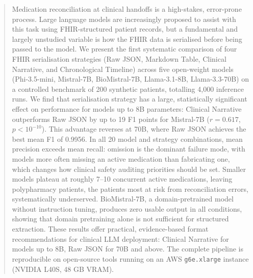 \begin{abstract}
Medication reconciliation at clinical handoffs is a high-stakes, error-prone process.
Large language models are increasingly proposed to assist with this task using
FHIR-structured patient records, but a fundamental and largely unstudied variable is
how the FHIR data is serialised before being passed to the model. We present the first
systematic comparison of four FHIR serialisation strategies (Raw JSON, Markdown Table,
Clinical Narrative, and Chronological Timeline) across five open-weight models
(Phi-3.5-mini, Mistral-7B, BioMistral-7B, Llama-3.1-8B, Llama-3.3-70B) on a
controlled benchmark of 200 synthetic patients, totalling 4,000 inference runs. We
find that serialisation strategy has a large, statistically significant effect on
performance for models up to 8B parameters: Clinical Narrative outperforms Raw JSON
by up to 19 F1 points for Mistral-7B ($r = 0.617$, $p < 10^{-10}$). This advantage
reverses at 70B, where Raw JSON achieves the best mean F1 of 0.9956. In all 20
model and strategy combinations, mean precision exceeds mean recall: omission is the
dominant failure mode, with models more often missing an active medication than
fabricating one, which changes how clinical safety auditing priorities should be set. Smaller models plateau at roughly 7--10 concurrent
active medications, leaving polypharmacy patients, the patients most at risk from
reconciliation errors, systematically underserved. BioMistral-7B, a domain-pretrained
model without instruction tuning, produces zero usable output in all conditions,
showing that domain pretraining alone is not sufficient for structured extraction.
These results offer practical, evidence-based format recommendations for clinical LLM
deployment: Clinical Narrative for models up to 8B, Raw JSON for 70B and above. The
complete pipeline is reproducible on open-source tools running on an AWS
\texttt{g6e.xlarge} instance (NVIDIA L40S, 48 GB VRAM).
\end{abstract}
